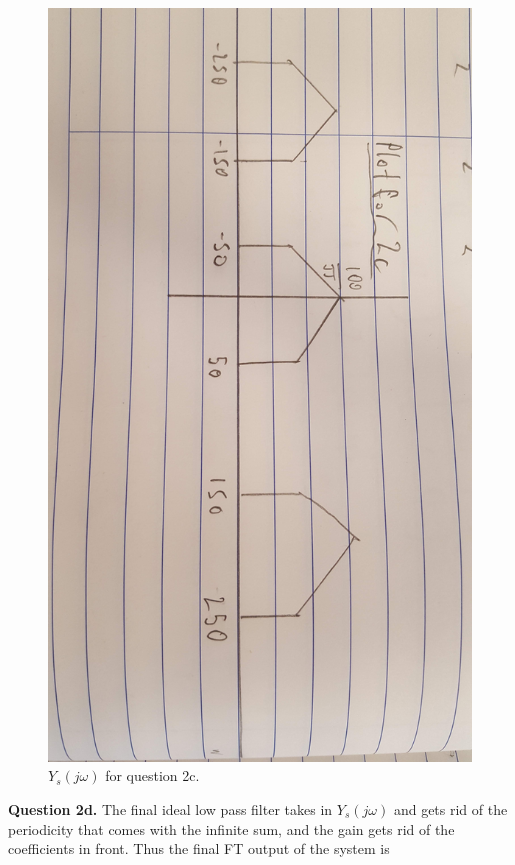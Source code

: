 \documentclass[letterpaper, reqno,11pt]{article}
\begin{document}
\begin{figure}[htbp]
\centering
\includegraphics[width=\textwidth]{2c}
\caption{$Y_s(j\omega)$ for question 2c. }
\label{fig:2c}
\end{figure}

{\noindent\bf Question 2d.} The final ideal low pass filter takes in $Y_s(j\omega)$ and gets rid of the periodicity that comes with the infinite sum, and the gain gets rid of the coefficients in front. Thus the final FT output of the system is 
\end{document}
